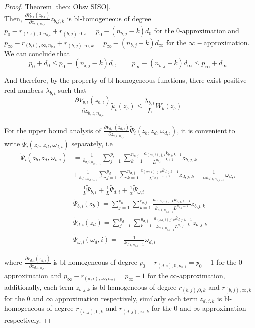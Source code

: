 \documentclass[11pt,letterpaper,twoside,openright]{report}
\begin{document}
\begin{proof}{Theorem \ref{theo: Obsv SISO}. \\}
	Then, $\frac{\partial V_{b,\iota}(z_{b,\iota})}{\partial z_{b,\iota,n_{b,\iota}}} z_{b,j,k}$ is bl-homogeneous of degree $p_0-r_{(b,\iota),0,n_{b,\iota}}+r_{(b,j),0,k} = p_0-( n_{b,j}-k )d_0$ for the 0-approximation and $p_{\infty}-r_{(b,\iota),\infty,n_{b,\iota}} +r_{(b,j),\infty,k} = p_{\infty}-( n_{b,j}-k )d_{\infty}$ for the $\infty-$approximation. We can conclude that 
	\begin{equation}
		p_0+d_0 \leq p_0-( n_{b,j}-k )d_0, \qquad p_{\infty}-( n_{b,j}-k )d_{\infty} \leq p_{\infty}+d_{\infty}
	\end{equation}
	
	And therefore, by the property of bl-homogeneous functions, there exist positive real numbers $\lambda_{b,\iota}$ such that
	\begin{equation}
		\frac{\partial V_{b,\iota}(z_{b,\iota})}{\partial z_{b,\iota,n_{b,\iota}}}\tilde{\mu}_{\iota}(z_b) \leq \frac{\lambda_{b,\iota}}{L}W_b(z_b)
	\end{equation}
	
	For the upper bound analysis of $\frac{\partial V_{d,i}(z_{d,i})}{\partial z_{d,i,n_{d,i}}}\tilde{\Psi}_{i}(z_b,z_d,\omega_{d,i})$, it is convenient to write $\tilde{\Psi}_{i}(z_b,z_d,\omega_{d,i})$ separately, i.e	
	\begin{equation}
		\begin{split}
			\tilde{\Psi}_{i}(z_b,z_d,\omega_{d,i}) &= \frac{1}{k_{d,i,n_{d,i-1}}}\sum_{j=1}^{p_b}\sum_{k=1}^{n_{b,j}}  \frac{a_{(db,i),j,k}k_{b,j,k-1}}{L^{n_{b,j}-k+1}} z_{b,j,k} \\
			&+ \frac{1}{k_{d,i,n_{d,i-1}}} \sum_{j=1}^{p_d}\sum_{k=1}^{n_{d,j}}  \frac{a_{(dd,i),j,k}k_{d,j,k-1}}{L^{n_{d,j}-k+1}} z_{d,j,k} - \frac{1}{\alpha k_{d,i,n_{d,i-1}}}\omega_{d,i}\\
			&= \frac{1}{L}\tilde{\Psi}_{b,i} + \frac{1}{L}\tilde{\Psi}_{d,i} + \frac{1}{\alpha}\tilde{\Psi}_{\omega, i} \\
			&\tilde{\Psi}_{b,i}(z_b) = \sum_{j=1}^{p_b}\sum_{k=1}^{n_{b,j}}  \frac{a_{(db,i),j,k}k_{b,j,k-1}}{k_{d,i,n_{d,i-1}} L^{n_{b,j}-k}} z_{b,j,k} \\
			&\tilde{\Psi}_{d,i}(z_d) = \sum_{j=1}^{p_d}\sum_{k=1}^{n_{d,j}}  \frac{a_{(dd,i),j,k}k_{d,j,k-1}}{k_{d,i,n_{d,i-1}} L^{n_{d,j}-k}} z_{d,j,k} \\
			&\tilde{\Psi}_{\omega,i}(\omega_d,i) = -\frac{1}{k_{d,i,n_{d,i}-1}}\omega_{d,i}
		\end{split} 
	\end{equation}

	where $\frac{\partial V_{d,i}(z_{d,i})}{\partial z_{d,i,n_{d,i}}}$ is bl-homogeneous of degree $p_0-r_{(d,i),0,n_{d,i}}=p_0-1$ for the $0$-approximation and $p_{\infty}-r_{(d,i),\infty,n_{d,i}}=p_{\infty}-1$ for the $\infty$-approximation, additionally, each term $z_{b,j,k}$ is bl-homogeneous of degree $r_{(b,j),0,k}$ and $r_{(b,j),\infty,k}$ for the $0$ and $\infty$ approximation respectively, similarly each term $z_{d,j,k}$ is bl-homogeneous of degree $r_{(d,j),0,k}$ and $r_{(d,j),\infty,k}$ for the $0$ and $\infty$ approximation respectively.
	

\end{proof}
\end{document}
